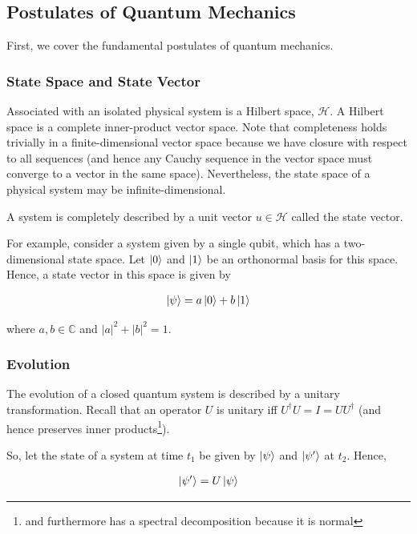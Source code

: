\documentclass[11pt]{article}
\newcommand\0{\mathbf{0}}
\newcommand\CC{\mathbb{C}}
\newcommand\<{\langle}
\renewcommand\>{\rangle}
\begin{document}
\subsection{Postulates of Quantum Mechanics}

First, we cover the fundamental postulates of quantum mechanics. 

\subsubsection{State Space and State Vector}

Associated with an isolated physical system is a Hilbert space, $\mathcal{H}$. A Hilbert space is a complete inner-product vector space. Note that completeness holds trivially in a finite-dimensional vector space because we have closure with respect to all sequences (and hence any Cauchy sequence in the vector space must converge to a vector in the same space). Nevertheless, the state space of a physical system may be infinite-dimensional. 

A system is completely described by a unit vector $u \in \mathcal{H}$ called the state vector.

For example, consider a system given by a single qubit, which has a two-dimensional state space. Let $\ket{0}$ and $\ket{1}$ be an orthonormal basis for this space. Hence, a state vector in this space is given by 

\begin{align*}
\ket{\psi} = a\ket{0} + b\ket{1}	
\end{align*}


where $a, b \in \CC$ and $|a|^2 + |b|^2 = 1$. 

\subsubsection{Evolution}\label{post-discrete-evol}

The evolution of a closed quantum system is described by a unitary transformation. Recall that an operator $U$ is unitary iff $U^\dagger U = I = UU^\dagger$ (and hence preserves inner products\footnote{and furthermore has a spectral decomposition because it is normal}).

So, let the state of a system at time $t_1$ be given by $\ket{\psi}$ and $\ket{\psi'}$ at $t_2$. Hence,

\begin{align*}
\ket{\psi'} = U\ket{\psi}	
\end{align*}
\end{document}
